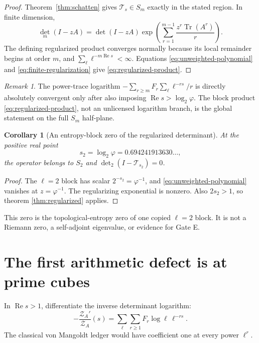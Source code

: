 \documentclass[11pt]{article}
\numberwithin{equation}{section}
\newtheorem{corollary}[theorem]{Corollary}
\theoremstyle{remark}
\newtheorem{remark}[theorem]{Remark}
\newcommand{\RePart}{\operatorname{Re}}
\newcommand{\Tr}{\operatorname{Tr}}
\newcommand{\cT}{\mathcal T}
\newcommand{\cZ}{\mathcal Z}
\begin{document}
\begin{proof}
Theorem~\ref{thm:schatten} gives \(\cT_s\in S_m\) exactly in the stated
region.  In finite dimension,
\begin{equation}
 \det_m(I-zA)=\det(I-zA)
 \exp\!\left(\sum_{r=1}^{m-1}\frac{z^r\Tr(A^r)}r\right).
 \label{eq:finite-regularization}
\end{equation}
The defining regularized product converges normally because its local
remainder begins at order \(m\), and \(\sum_\ell\ell^{-m\RePart s}<\infty\).
Equations \eqref{eq:unweighted-polynomial} and
\eqref{eq:finite-regularization} give \eqref{eq:regularized-product}.
\end{proof}

\begin{remark}
The power-trace logarithm
\(
-\sum_{r\ge m}F_r\sum_\ell\ell^{-rs}/r
\)
is directly absolutely convergent only after also imposing
\(\RePart s>\log_2\varphi\).  The block product
\eqref{eq:regularized-product}, not an unlicensed logarithm branch, is the
global statement on the full \(S_m\) half-plane.
\end{remark}

\begin{corollary}[An entropy-block zero of the regularized determinant]
\label{cor:entropy-zero}
At the positive real point
\begin{equation}
 s_2=\log_2\varphi=0.694241913630\ldots,
 \label{eq:entropy-zero}
\end{equation}
the operator belongs to \(S_2\) and \(\det_2(I-\cT_{s_2})=0\).
\end{corollary}

\begin{proof}
The \(\ell=2\) block has scalar \(2^{-s_2}=\varphi^{-1}\), and
\eqref{eq:unweighted-polynomial} vanishes at \(z=\varphi^{-1}\).  The
regularizing exponential is nonzero.  Also \(2s_2>1\), so theorem
\ref{thm:regularized} applies.
\end{proof}

This zero is the topological-entropy zero of one copied \(\ell=2\) block.  It
is not a Riemann zero, a self-adjoint eigenvalue, or evidence for Gate E.

\section{The first arithmetic defect is at prime cubes}

In \(\RePart s>1\), differentiate the inverse determinant logarithm:
\begin{equation}
 -\frac{\cZ_A'}{\cZ_A}(s)
 =\sum_{\ell}\sum_{r\ge1}
 F_r\log\ell\,\ell^{-rs}.
 \label{eq:trace-ledger}
\end{equation}
The classical von Mangoldt ledger would have coefficient one at every power
\(\ell^r\).
\end{document}
